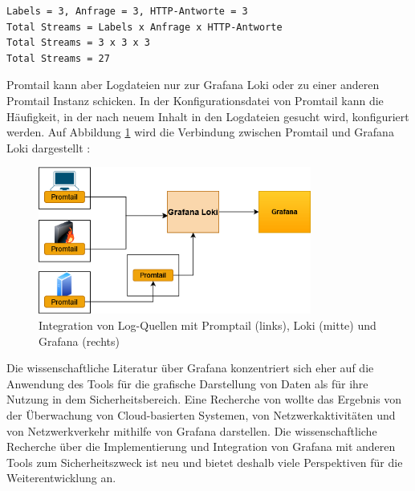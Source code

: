 {
\begin{Verbatim}[commandchars=\\\{\},frame=single]
Labels = 3, Anfrage = 3, HTTP-Antworte = 3
Total Streams = Labels x Anfrage x HTTP-Antworte
Total Streams = 3 x 3 x 3
Total Streams = 27
\end{Verbatim}
}

Promtail kann aber Logdateien nur zur Grafana Loki oder zu einer anderen Promtail Instanz schicken. In der Konfigurationsdatei von Promtail kann die Häufigkeit, in der nach neuem Inhalt in den Logdateien gesucht wird, konfiguriert werden. Auf Abbildung \ref{fig:Integration_Loki_Promtail_Grafana} wird die Verbindung zwischen Promtail und Grafana Loki dargestellt \citep{Grafana_Logs}:


\begin{figure}[H]
   \centering
   \includegraphics[width=0.8\textwidth]{assets/Promtail.png}
   \caption[Integration von Log-Quellen mit Promptail, Loki und Grafana]
   {Integration von Log-Quellen mit Promptail (links), Loki (mitte) und Grafana (rechts)}
   \label{fig:Integration_Loki_Promtail_Grafana}
   \centering
\end{figure}

Die wissenschaftliche Literatur über Grafana konzentriert sich eher auf die Anwendung des Tools für die grafische Darstellung von Daten als für ihre Nutzung in dem Sicherheitsbereich. Eine Recherche von \cite{Manases_grafananetwork} wollte das Ergebnis von der Überwachung von Cloud-basierten Systemen, von Netzwerkaktivitäten und von Netzwerkverkehr mithilfe von Grafana darstellen.
Die wissenschaftliche Recherche über die Implementierung und Integration von Grafana mit anderen Tools zum Sicherheitszweck ist neu und bietet deshalb viele Perspektiven für die Weiterentwicklung an.

